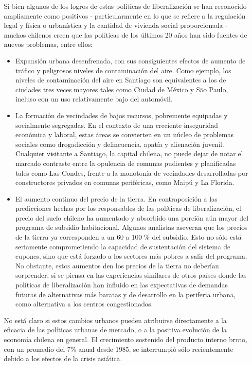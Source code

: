 Si bien algunos de los logros de estas políticas de liberalización se han reconocido ampliamente
como positivos - particularmente en lo que se refiere a la regulación legal y física o urbanística
y la cantidad de vivienda social proporcionada - muchos chilenos creen que las políticas de los
últimos 20 años han sido fuentes de nuevos problemas, entre ellos:

\begin{itemize}
  \item Expansión urbana desenfrenada, con sus consiguientes efectos de aumento de tráfico y
  peligrosos niveles de contaminación del aire. Como ejemplo, los niveles de contaminación del aire
  en Santiago son  equivalentes a los de ciudades tres veces mayores tales como Ciudad de México y
  S\~{a}o Paulo, incluso con un uso relativamente bajo del automóvil.
  \item La formación de vecindades de bajos recursos, pobremente equipadas y socialmente segregadas.
  En el contexto de una creciente inseguridad económica y laboral, estas áreas se convierten en un
  núcleo de problemas sociales como drogadicción y delincuencia, apatía y alienación juvenil.
  Cualquier visitante a Santiago, la capital chilena, no puede dejar de notar el marcado contraste
  entre la opulencia de comunas pudientes y planificadas tales como Las Condes, frente a la
  monotonía de vecindades desarrolladas por constructores privados en comunas periféricas, como
  Maipú y La Florida.
  \item El aumento continuo del precio de la tierra. En contraposición a las predicciones hechas por
  los responsables de las políticas de liberalización, el precio del suelo chileno ha aumentado y
  absorbido una porción aún mayor del programa de subsidio habitacional. Algunos analistas aseveran
  que los precios de la tierra ya corresponden a un 60 a 100 \% del subsidio. Esto no sólo está
  seriamente comprometiendo la capacidad de sustentación del sistema de cupones, sino que  está
  forzado a los sectores más pobres a salir del programa. No obstante, estos aumentos den los
  precios de la tierra no deberían sorprender, si se piensa en las experiencias similares de otros
  países donde las políticas de liberalización han influido en las expectativas de demandas futuras
  de alternativas más baratas y de desarrollo en la periferia urbana, como alternativa a los centros
  congestionados.
\end{itemize}

No está claro si estos cambios urbanos pueden atribuirse directamente a la eficacia de las políticas
urbanas de mercado, o a la positiva evolución de la economía chilena en general. El crecimiento
sostenido del producto interno bruto, con un promedio del 7\% anual desde 1985, se interrumpió sólo
recientemente debido a los efectos de la crisis asiática.

